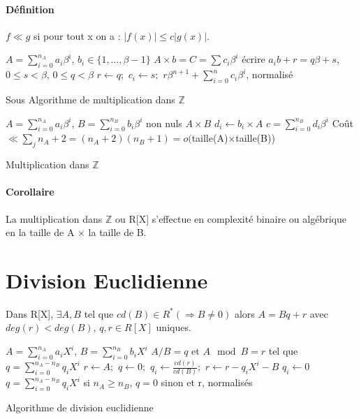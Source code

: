 \documentclass[12pt,a4paper]{report}
\begin{document}
\paragraph{Définition\\}
$ f\ll g$ si pour tout x on a : $ |f(x)| \leqslant c |g(x)| $.
\begin{algorithm}[h!]
\begin{algorithmic}
\REQUIRE $\displaystyle A=\sum_{i=0}^{n_A} a_i \beta^i$, $b_i \in \{1,\ldots,\beta -1\}$ 
\ENSURE $ A\times b=C= \sum c_i \beta^i$
\STATE écrire $a_ib+r = q\beta + s$,  $ 0 \leqslant s < \beta$, $ 0 \leqslant q < \beta $ 
\STATE $ r\leftarrow q;$
\STATE $ c_i \leftarrow s;$
\ENDFOR
\RETURN $r\beta^{n+1} + \sum_{i=0}^{n} c_i \beta^{i}$, normalisé
\end{algorithmic}
\caption{Sous Algorithme de multiplication dans $\mathbb{Z}$}
\end{algorithm}
\begin{algorithm}[h!]
\begin{algorithmic}
\REQUIRE $\displaystyle A=\sum_{i=0}^{n_A} a_i \beta^i$, $B = \displaystyle \sum_{i=0}^{n_B} b_i \beta^i$ non nuls
\ENSURE $ A\times B$
\STATE $d_i \leftarrow b_i \times A $
\ENDFOR
\RETURN $c=\displaystyle \sum_{i=0}^{n_B}d_i\beta^i$
\STATE Coût $\ll \sum_{j} n_A + 2 = (n_A+2)(n_B+1)=o($taille(A)$\times$taille(B))
\end{algorithmic}
\caption{Multiplication dans $\mathbb{Z}$}
\end{algorithm}
\paragraph{Corollaire\\}
La multiplication dans $\mathbb{Z}$ ou R[X] s'effectue en complexité binaire ou algébrique en la taille de A $\times$ la taille de B.
\section{Division Euclidienne}
Dans R[X], $\exists A,B$ tel que $ cd(B) \in R^* (\Rightarrow B \neq 0)$ alors $ A=Bq+r$ avec $ deg(r) < deg(B)$, $q,r \in R[X]$ uniques.
\begin{algorithm}[h!]
\begin{algorithmic}
\REQUIRE $\displaystyle A=\sum_{i=0}^{n_A} a_i X^i$, $\displaystyle B=\sum_{i=0}^{n_B} b_i X^i$ 
\ENSURE $ A/B=q$ et $A \mod B = r$ tel que $ \displaystyle q= \sum_{i=0}^{n_A-n_B} q_i X^i$
\STATE $ r\leftarrow A;$  $q \leftarrow 0;$
\STATE $q_i \leftarrow \frac{cd(r)}{cd(B)};$ 
\STATE $ r\leftarrow r-q_iX^i - B$
\ELSE 
\STATE $q_i \leftarrow 0$
\ENDIF
\ENDFOR
\RETURN $\displaystyle q=\sum_{i=0}^{n_A-n_B} q_i X^i$ si $n_A \geqslant n_B$, $q=0$ sinon  et r, normalisés
\end{algorithmic}
\caption{Algorithme de division euclidienne}
\end{algorithm}
\end{document}
